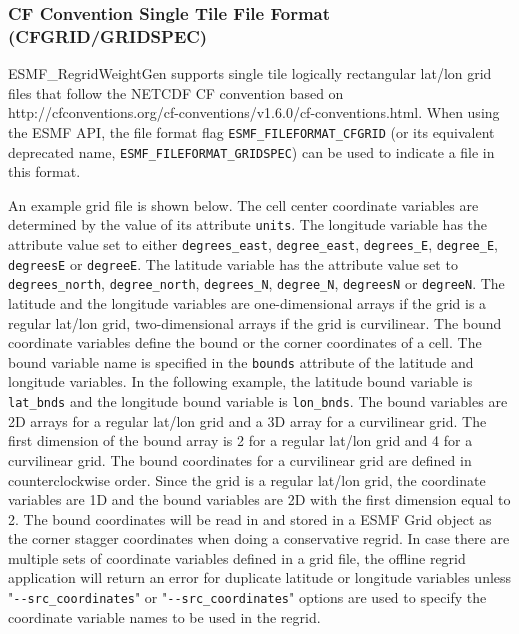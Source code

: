 \subsubsection{CF Convention Single Tile File Format (CFGRID/GRIDSPEC)}\label{sec:fileformat:gridspec}

ESMF\_RegridWeightGen supports single tile logically rectangular lat/lon grid files that follow the NETCDF CF convention based on
 {http://cfconventions.org/cf-conventions/v1.6.0/cf-conventions.html}. When using the ESMF API, the file format flag {\tt ESMF\_FILEFORMAT\_CFGRID} (or its equivalent deprecated name, {\tt ESMF\_FILEFORMAT\_GRIDSPEC}) can be used to indicate a file in this format.  

 An example grid file is shown below.
The cell center coordinate variables are determined by the value of its attribute {\tt units}.  The longitude
variable has the attribute value set to either {\tt degrees\_east}, {\tt degree\_east}, {\tt degrees\_E}, {\tt degree\_E},
{\tt degreesE} or {\tt degreeE}.  The latitude variable has the attribute value set to {\tt degrees\_north}, {\tt degree\_north}, {\tt degrees\_N},
{\tt degree\_N}, {\tt degreesN} or {\tt degreeN}.   The latitude and the longitude variables are one-dimensional arrays if the grid is a regular lat/lon grid, two-dimensional arrays if the grid is curvilinear. The bound coordinate
variables define the bound or the corner coordinates of a cell.  The bound variable name is specified in the
{\tt bounds} attribute of the latitude and longitude variables.  In the following example, the latitude bound
variable is {\tt lat\_bnds} and the longitude bound variable is {\tt lon\_bnds}.  The bound variables are 2D
arrays for a regular lat/lon grid and a 3D array for a curvilinear grid.  The first dimension of the bound
array is 2 for a regular lat/lon grid and 4 for a curvilinear grid.  The bound coordinates for a curvilinear
grid are defined in counterclockwise order. Since the grid is a regular lat/lon grid,
the coordinate variables are 1D and the bound variables are 2D with the first dimension equal to 2.
The bound coordinates will be read in and stored in a ESMF Grid object as the corner stagger coordinates when doing a conservative regrid.  In case there are multiple sets of coordinate variables defined in a grid file,
the offline regrid application will return an error for duplicate latitude or longitude variables unless
"{\tt \verb+--+src\_coordinates}" 
or "{\tt \verb+--+src\_coordinates}" options are used to specify the coordinate variable names
to be used in the regrid.

